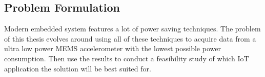 \subsection*{Problem Formulation}

Modern embedded system features a lot of power saving techniques. The problem of this thesis evolves around using all of these techniques to acquire data from a ultra low power MEMS accelerometer with the lowest possible power consumption. Then use the results to conduct a feasibility study of which IoT application the solution will be best suited for.